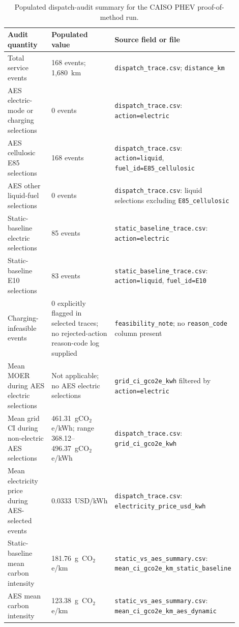 \documentclass[cleantechnol,article,submit,pdftex,moreauthors]{Definitions/mdpi}
\newcommand{\gcoeqkm}{g~CO$_2$e/km}
\begin{document}
\begin{table}[htbp]
\centering
\begin{threeparttable}
\caption{Populated dispatch-audit summary for the CAISO PHEV proof-of-method run.}
\label{tab:dispatch_audit_required}
\scriptsize
\begin{tabular}{p{0.34\linewidth}p{0.25\linewidth}p{0.31\linewidth}}
\toprule
Audit quantity & Populated value & Source field or file \\
\midrule
Total service events & 168 events; 1,680~km & \texttt{dispatch\_trace.csv}; \texttt{distance\_km} \\
AES electric-mode or charging selections & 0 events & \texttt{dispatch\_trace.csv}: \texttt{action=electric} \\
AES cellulosic E85 selections & 168 events & \texttt{dispatch\_trace.csv}: \texttt{action=liquid}, \texttt{fuel\_id=E85\_cellulosic} \\
AES other liquid-fuel selections & 0 events & \texttt{dispatch\_trace.csv}: liquid selections excluding \texttt{E85\_cellulosic} \\
Static-baseline electric selections & 85 events & \texttt{static\_baseline\_trace.csv}: \texttt{action=electric} \\
Static-baseline E10 selections & 83 events & \texttt{static\_baseline\_trace.csv}: \texttt{action=liquid}, \texttt{fuel\_id=E10} \\
Charging-infeasible events & 0 explicitly flagged in selected traces; no rejected-action reason-code log supplied & \texttt{feasibility\_note}; no \texttt{reason\_code} column present \\
Mean MOER during AES electric selections & Not applicable; no AES electric selections & \texttt{grid\_ci\_gco2e\_kwh} filtered by \texttt{action=electric} \\
Mean grid CI during non-electric AES selections & 461.31~gCO$_2$e/kWh; range 368.12--496.37~gCO$_2$e/kWh & \texttt{dispatch\_trace.csv}: \texttt{grid\_ci\_gco2e\_kwh} \\
Mean electricity price during AES-selected events & 0.0333~USD/kWh & \texttt{dispatch\_trace.csv}: \texttt{electricity\_price\_usd\_kwh} \\
Static-baseline mean carbon intensity & 181.76~\gcoeqkm{} & \texttt{static\_vs\_aes\_summary.csv}: \texttt{mean\_ci\_gco2e\_km\_static\_baseline} \\
AES mean carbon intensity & 123.38~\gcoeqkm{} & \texttt{static\_vs\_aes\_summary.csv}: \texttt{mean\_ci\_gco2e\_km\_aes\_dynamic} \\

\end{tabular}
\end{threeparttable}
\end{table}
\end{document}
